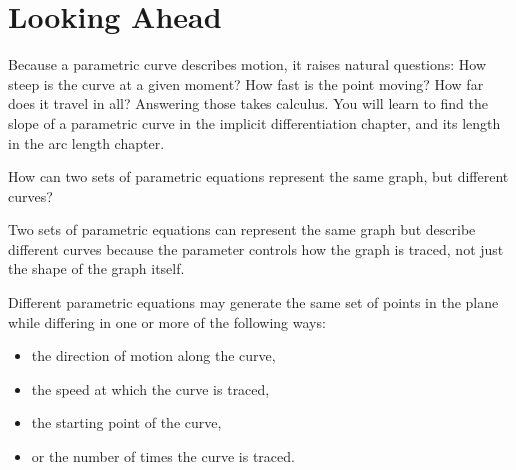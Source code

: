 \section{Looking Ahead}
Because a parametric curve describes motion, it raises natural questions:
How steep is the curve at a given moment? How fast is the point moving?
How far does it travel in all? Answering those takes calculus. You will
learn to find the slope of a parametric curve in the implicit
differentiation chapter, and its length in the arc length chapter.

\begin{Exercise}[label = parametric5]
    How can two sets of parametric equations represent the same graph, but different curves?
\end{Exercise}

\begin{Answer}[ref=parametric5]

    Two sets of parametric equations can represent the same graph but
    describe different curves because the parameter controls how the graph
    is traced, not just the shape of the graph itself.

    Different parametric equations may generate the same set of points in the
    plane while differing in one or more of the following ways:
    \begin{itemize}
        \item the direction of motion along the curve,
        \item the speed at which the curve is traced,
        \item the starting point of the curve,
        \item or the number of times the curve is traced.
    \end{itemize}

\end{Answer}

